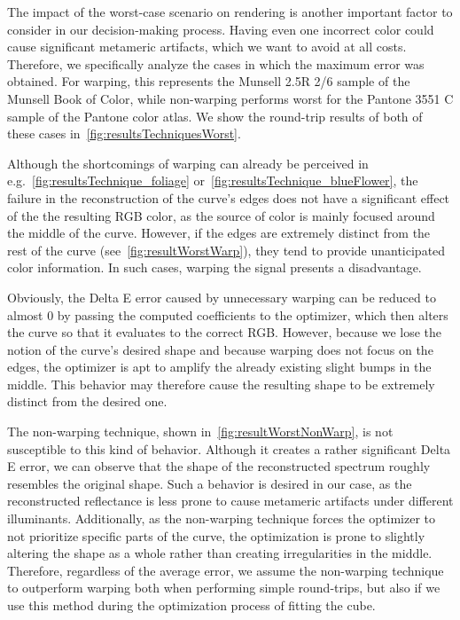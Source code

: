 The impact of the worst-case scenario on rendering is another important factor to consider in our decision-making process. Having even one incorrect color could cause significant metameric artifacts, which we want to avoid at all costs. Therefore, we specifically analyze the cases in which the maximum error was obtained. For warping, this represents the Munsell 2.5R 2/6 sample of the Munsell Book of Color, while non-warping performs worst for the Pantone 3551 C sample of the Pantone color atlas. We show the round-trip results of both of these cases in~\cref{fig:resultsTechniquesWorst}.

Although the shortcomings of warping can already be perceived in e.g.~\cref{fig:resultsTechnique_foliage} or~\cref{fig:resultsTechnique_blueFlower}, the failure in the reconstruction of the curve's edges does not have a significant effect of the the resulting RGB color, as the source of color is mainly focused around the middle of the curve. However, if the edges are extremely distinct from the rest of the curve (see~\cref{fig:resultWorstWarp}), they tend to provide unanticipated color information. In such cases, warping the signal presents a disadvantage.

Obviously, the Delta E error caused by unnecessary warping can be reduced to almost 0 by passing the computed coefficients to the optimizer, which then alters the curve so that it evaluates to the correct RGB. However, because we lose the notion of the curve's desired shape and because warping does not focus on the edges, the optimizer is apt to amplify the already existing slight bumps in the middle. This behavior may therefore cause the resulting shape to be extremely distinct from the desired one. 

The non-warping technique, shown in~\cref{fig:resultWorstNonWarp}, is not susceptible to this kind of behavior. Although it creates a rather significant Delta E error, we can observe that the shape of the reconstructed spectrum roughly resembles the original shape. Such a behavior is desired in our case, as the reconstructed reflectance is less prone to cause metameric artifacts under different illuminants. Additionally, as the non-warping technique forces the optimizer to not prioritize specific parts of the curve, the optimization is prone to slightly altering the shape as a whole rather than creating 
irregularities in the middle. Therefore, regardless of the average error, we assume the non-warping technique to outperform warping both when performing simple round-trips, but also if we use this method during the optimization process of fitting the cube.

